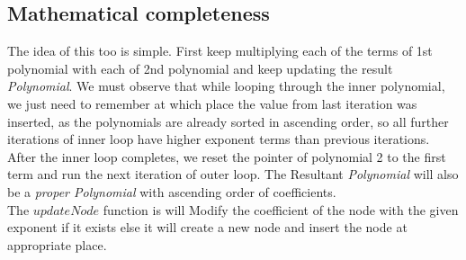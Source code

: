 \subsection{Mathematical completeness}
The idea of this too is simple. First keep multiplying each of the terms of 1st polynomial with each of 2nd polynomial and keep updating the result \textit{Polynomial}. We must observe that while looping through the inner polynomial, we just need to remember at which place the value from last iteration was inserted, as the polynomials are already sorted in ascending order, so all further iterations of inner loop have higher exponent terms than previous iterations. After the inner loop completes, we reset the pointer of polynomial 2 to the first term and run the next iteration of outer loop. The Resultant \textit{Polynomial} will also be a \textit{proper Polynomial} with ascending order of coefficients. \vspace{5pt} \\
The $updateNode$ function is will Modify the coefficient of the node with the given exponent if it exists else it will create a new node and insert the node at appropriate place.
 
